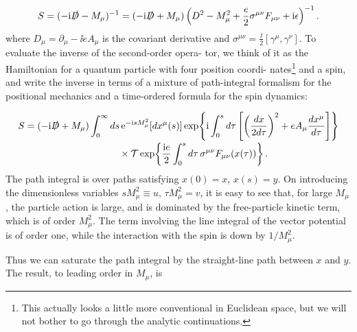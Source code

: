 \begin{equation}
  S=(-\mathrm{i}\slashed D-M_\mu)^{-1}
  =(-\mathrm{i}\slashed D+M_\mu)
  \left(D^2-M_\mu^2+\frac{e}{2}\sigma^{\mu\nu}F_{\mu\nu}+\mathrm{i}\epsilon\right)^{-1}.
  \label{eq:6.14}
\end{equation}
where $D_\mu=\partial_\mu-\ii e A_\mu$ is the covariant derivative and
$\sigma^{\mu\nu}=\frac{\ii}{2}[\gamma^\mu,\gamma^\nu]$. To evaluate the inverse of the second-order opera-
tor, we think of it as the Hamiltonian for a quantum particle with four position coordi-
nates\footnote[4]{This actually looks a little more conventional in Euclidean space, but we will not bother to go through the analytic continuations.} and a spin, and write the inverse in terms of a mixture of path-integral formalism
for the positional mechanics and a time-ordered formula for the spin dynamics:

\begin{equation}
  \begin{aligned}
  S={}&(-\ii\slashed D+M_\mu)\int_0^\infty ds\,\ee^{-\ii sM_\mu^2}[dx^\mu(s)]
  \exp\!\left\{\ii\int_0^s d\tau\left[\left(\frac{dx}{2d\tau}\right)^2
  +eA_\mu\frac{dx^\mu}{d\tau}\right]\right\}\\[-2pt]
  &\hspace{3cm}\times\mathcal{T}\exp\!\left\{\frac{\ii e}{2}\int_0^s d\tau\,
  \sigma^{\mu\nu}F_{\mu\nu}(x(\tau))\right\}.
  \end{aligned}
  \label{eq:6.15}
\end{equation}
The path integral is over paths satisfying $x(0)=x$, $x(s)=y$. On introducing the
dimensionless variables $sM_\mu^2\equiv u$, $\tau M_\mu^2=v$, it is easy to see that, for large
$M_\mu$, the particle action is large, and is dominated by the free-particle kinetic term, which is of
order $M_\mu^2$. The term involving the line integral of the vector potential is of order one,
while the interaction with the spin is down by $1/M_\mu^2$.


Thus we can saturate the path integral by the straight-line path between $x$ and $y$.
The result, to leading order in $M_\mu$, is


